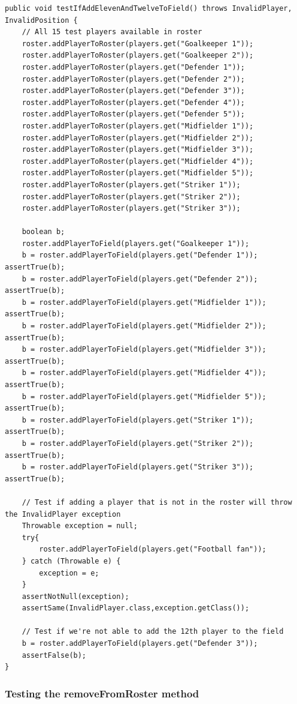 \documentclass{article}
\begin{document}
\begin{lstlisting}
public void testIfAddElevenAndTwelveToField() throws InvalidPlayer, InvalidPosition {
	// All 15 test players available in roster
	roster.addPlayerToRoster(players.get("Goalkeeper 1"));
	roster.addPlayerToRoster(players.get("Goalkeeper 2"));
	roster.addPlayerToRoster(players.get("Defender 1"));
	roster.addPlayerToRoster(players.get("Defender 2"));
	roster.addPlayerToRoster(players.get("Defender 3"));
	roster.addPlayerToRoster(players.get("Defender 4"));
	roster.addPlayerToRoster(players.get("Defender 5"));
	roster.addPlayerToRoster(players.get("Midfielder 1"));
	roster.addPlayerToRoster(players.get("Midfielder 2"));
	roster.addPlayerToRoster(players.get("Midfielder 3"));
	roster.addPlayerToRoster(players.get("Midfielder 4"));
	roster.addPlayerToRoster(players.get("Midfielder 5"));
	roster.addPlayerToRoster(players.get("Striker 1"));
	roster.addPlayerToRoster(players.get("Striker 2"));
	roster.addPlayerToRoster(players.get("Striker 3"));
	
	boolean b;
	roster.addPlayerToField(players.get("Goalkeeper 1"));	
	b = roster.addPlayerToField(players.get("Defender 1"));		assertTrue(b);
	b = roster.addPlayerToField(players.get("Defender 2"));		assertTrue(b);
	b = roster.addPlayerToField(players.get("Midfielder 1"));	assertTrue(b);
	b = roster.addPlayerToField(players.get("Midfielder 2"));	assertTrue(b);
	b = roster.addPlayerToField(players.get("Midfielder 3"));	assertTrue(b);
	b = roster.addPlayerToField(players.get("Midfielder 4"));	assertTrue(b);
	b = roster.addPlayerToField(players.get("Midfielder 5"));	assertTrue(b);
	b = roster.addPlayerToField(players.get("Striker 1"));		assertTrue(b);
	b = roster.addPlayerToField(players.get("Striker 2"));		assertTrue(b);
	b = roster.addPlayerToField(players.get("Striker 3"));		assertTrue(b);
	
	// Test if adding a player that is not in the roster will throw the InvalidPlayer exception
	Throwable exception = null;
	try{
		roster.addPlayerToField(players.get("Football fan"));
	} catch (Throwable e) {
		exception = e;
	}
	assertNotNull(exception);
	assertSame(InvalidPlayer.class,exception.getClass());
	
	// Test if we're not able to add the 12th player to the field
	b = roster.addPlayerToField(players.get("Defender 3"));
	assertFalse(b);
}
\end{lstlisting}

\subsubsection{Testing the removeFromRoster method}
\end{document}
